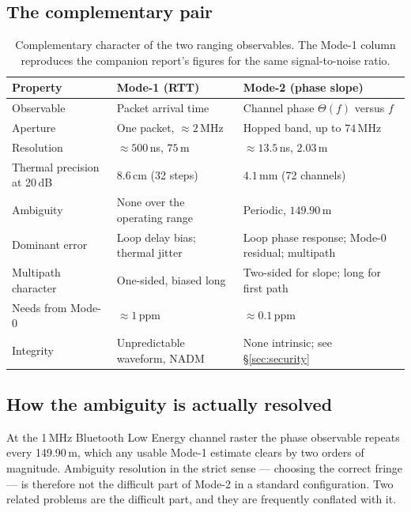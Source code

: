 \documentclass[11pt,a4paper]{article}
\newcommand{\NADM}{\mathrm{NADM}}
\begin{document}
\subsection{The complementary pair}

\begin{table}[h]
\caption{Complementary character of the two ranging observables. The Mode-1 column reproduces the
companion report's figures for the same signal-to-noise ratio.}
\label{tab:fusion}
\centering\small
\begin{tabular}{@{}L{34mm}L{45mm}L{45mm}@{}}
\toprule
Property & Mode-1 (RTT) & Mode-2 (phase slope) \\
\midrule
Observable & Packet arrival time & Channel phase $\Theta(f)$ versus $f$ \\
Aperture & One packet, $\approx 2$\,MHz & Hopped band, up to $74$\,MHz \\
Resolution & $\approx 500$\,ns, $75$\,m & $\approx 13.5$\,ns, $2.03$\,m \\
Thermal precision at 20\,dB & $8.6$\,cm (32 steps) & $4.1$\,mm (72 channels) \\
Ambiguity & None over the operating range & Periodic, $149.90$\,m \\
Dominant error & Loop delay bias; thermal jitter & Loop phase response; Mode-0 residual; multipath \\
Multipath character & One-sided, biased long & Two-sided for slope; long for first path \\
Needs from Mode-0 & $\approx 1$\,ppm & $\approx 0.1$\,ppm \\
Integrity & Unpredictable waveform, $\NADM$ & None intrinsic; see \S\ref{sec:security} \\
\bottomrule
\end{tabular}
\end{table}

\subsection{How the ambiguity is actually resolved}

At the 1\,MHz Bluetooth Low Energy channel raster the phase observable repeats every 149.90\,m, which
any usable Mode-1 estimate clears by two orders of magnitude. Ambiguity resolution in the strict
sense --- choosing the correct fringe --- is therefore not the difficult part of Mode-2 in a standard
configuration. Two related problems are the difficult part, and they are frequently conflated with it.
\end{document}
